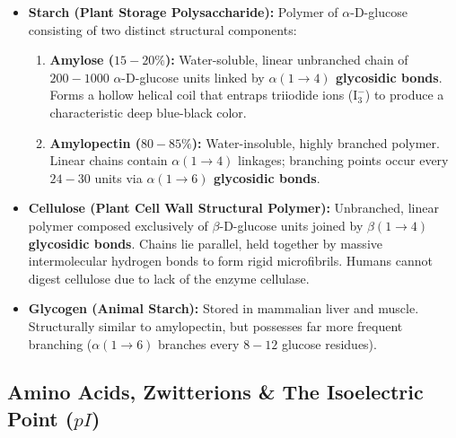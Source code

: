 \documentclass[10pt,a4paper]{article}
\begin{document}
\begin{usecasebox}
\begin{itemize}
  \item \textbf{Starch (Plant Storage Polysaccharide):} Polymer of $\alpha$-D-glucose consisting of two distinct structural components:
  \begin{enumerate}
    \item \textbf{Amylose ($15-20\%$):} Water-soluble, linear unbranched chain of $200-1000$ $\alpha$-D-glucose units linked by \textbf{$\alpha(1 \to 4)$ glycosidic bonds}. Forms a hollow helical coil that entraps triiodide ions ($\mathrm{I_3^-}$) to produce a characteristic deep blue-black color.
    \item \textbf{Amylopectin ($80-85\%$):} Water-insoluble, highly branched polymer. Linear chains contain $\alpha(1 \to 4)$ linkages; branching points occur every $24-30$ units via \textbf{$\alpha(1 \to 6)$ glycosidic bonds}.
  \end{enumerate}
  \item \textbf{Cellulose (Plant Cell Wall Structural Polymer):} Unbranched, linear polymer composed exclusively of $\beta$-D-glucose units joined by \textbf{$\beta(1 \to 4)$ glycosidic bonds}. Chains lie parallel, held together by massive intermolecular hydrogen bonds to form rigid microfibrils. Humans cannot digest cellulose due to lack of the enzyme cellulase.
  \item \textbf{Glycogen (Animal Starch):} Stored in mammalian liver and muscle. Structurally similar to amylopectin, but possesses far more frequent branching ($\alpha(1 \to 6)$ branches every $8-12$ glucose residues).
\end{itemize}
\end{usecasebox}

\subsection{Amino Acids, Zwitterions \& The Isoelectric Point (\texorpdfstring{$pI$}{pI})}
\end{document}
